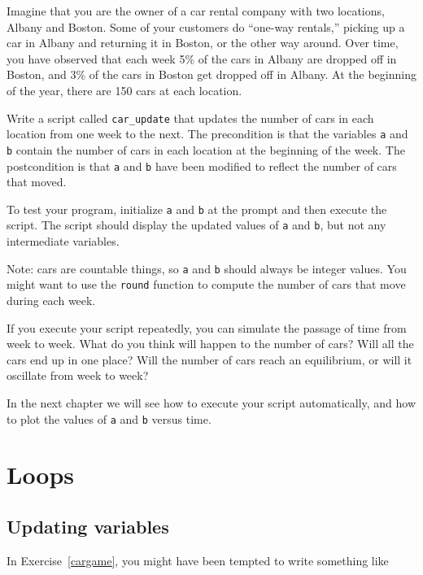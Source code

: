 \documentclass{book}
\begin{document}
\begin{ex}
\label{cargame}

Imagine that you are the owner of a car rental company with two
locations, Albany and Boston. Some of your customers do ``one-way
rentals,'' picking up a car in Albany and returning it in Boston, or
the other way around. Over time, you have observed that each week 5\%
of the cars in Albany are dropped off in Boston, and 3\% of the cars
in Boston get dropped off in Albany.
At the beginning of the year, there are 150 cars at each location.

Write a script called {\tt car\_update} that updates the number
of cars in each location from one week to the next. The precondition
is that the variables {\tt a} and {\tt b} contain the number of cars
in each location at the beginning of the week. The postcondition
is that {\tt a} and {\tt b} have been modified to reflect the number
of cars that moved.

To test your program, initialize {\tt a} and {\tt b} at
the prompt and then execute the script. The script should display
the updated values of {\tt a} and {\tt b}, but not any intermediate
variables.

Note: cars are countable things, so {\tt a} and {\tt b} should always
be integer values. You might want to use the {\tt round} function
to compute the number of cars that move during each week.

If you execute your script repeatedly, you can simulate the passage
of time from week to week. What do you think will happen to the
number of cars? Will all the cars end up in one place? Will the
number of cars reach an equilibrium, or will it oscillate from week
to week?

In the next chapter we will see how to execute your script automatically,
and how to plot the values of {\tt a} and {\tt b} versus time.
\end{ex}



\chapter{Loops}

\section{Updating variables}

In Exercise~\ref{cargame}, you might have been tempted to write something
like
\end{document}
